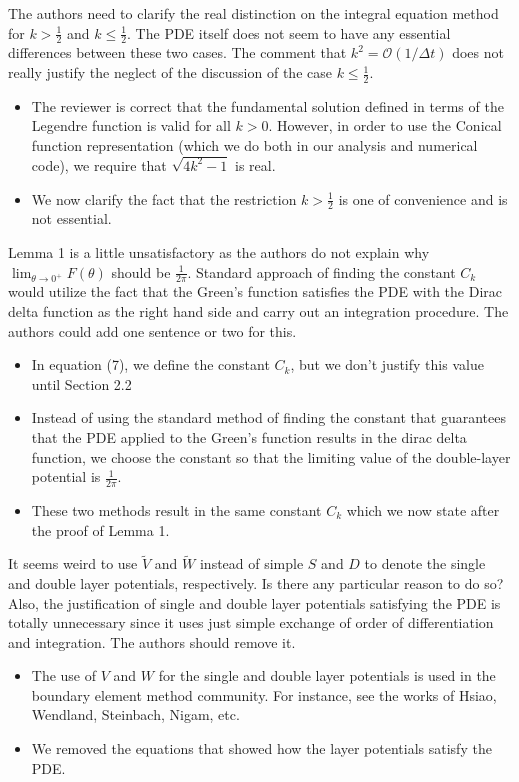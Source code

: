 \documentclass[11pt]{article}
\newcommand{\comment}[1]{{\color{blue} #1}}
\begin{document}
\comment{The authors need to clarify the real distinction on the
integral equation method for $k > \frac{1}{2}$ and $k \leq
\frac{1}{2}$.  The PDE itself does not seem to have any essential
differences between these two cases. The comment that $k^{2} =
\mathcal{O}(1/\Delta t)$ does not really justify the neglect of the
discussion of the case $k\leq\frac{1}{2}.$}
\begin{itemize}
  \item The reviewer is correct that the fundamental solution defined in
  terms of the Legendre function is valid for all $k > 0$.  However, in
  order to use the Conical function representation (which we do both in
  our analysis and numerical code), we require that $\sqrt{4k^{2}-1}$ is
  real.
  \item We now clarify the fact that the restriction $k > \frac{1}{2}$
  is one of convenience and is not essential.
\end{itemize}

\comment{Lemma 1 is a little unsatisfactory as the authors do not
explain why $\lim_{\theta \rightarrow 0^{+}}F(\theta)$ should be
$\frac{1}{2\pi}$.  Standard approach of finding the constant $C_{k}$
would utilize the fact that the Green’s function satisfies the PDE with
the Dirac delta function as the right hand side and carry out an
integration procedure. The authors could add one sentence or two for
this.}
\begin{itemize}
  \item In equation (7), we define the constant $C_{k}$, but we don't
  justify this value until Section 2.2
  \item Instead of using the standard method of finding the constant
  that guarantees that the PDE applied to the Green's function results
  in the dirac delta function, we choose the constant so that the
  limiting value of the double-layer potential is $\frac{1}{2\pi}$.
  \item These two methods result in the same constant $C_{k}$ which we
  now state after the proof of Lemma 1.
\end{itemize}

\comment{It seems weird to use $\tilde{V}$ and $\tilde{W}$ instead of
simple $S$ and $D$ to denote the single and double layer potentials,
respectively. Is there any particular reason to do so?  Also, the
justification of single and double layer potentials satisfying the PDE
is totally unnecessary since it uses just simple exchange of order of
differentiation and integration.  The authors should remove it.}
\begin{itemize}
  \item The use of $V$ and $W$ for the single and double layer
  potentials is used in the boundary element method community.  For
  instance, see the works of Hsiao, Wendland, Steinbach, Nigam, etc.
  \item We removed the equations that showed how the layer potentials
  satisfy the PDE.
\end{itemize}
\end{document}
